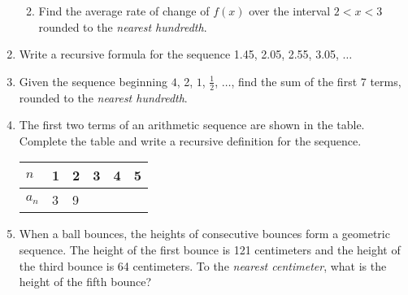 \documentclass[12pt, twoside]{article}
\begin{document}
\begin{enumerate}[itemsep=0.5cm]
\begin{enumerate}
\begin{center}
    \end{center}
    \item Find the average rate of change of $f(x)$ over the interval $2 < x < 3$ rounded to the \emph{nearest hundredth}.
\end{enumerate}

\newpage
\item Write a recursive formula for the sequence 1.45, 2.05, 2.55, 3.05, $\ldots$ \vspace{3cm}


\item Given the sequence beginning  $4$, 2, $1$, $\frac{1}{2}$, $\ldots$, find the sum of the first 7 terms, rounded to the \emph{nearest hundredth}. \vspace{3cm}

\item The first two terms of an arithmetic sequence are shown in the table. Complete the table and write a recursive definition for the sequence.
\begin{center}
\begin{tabular}{|p{1cm}|p{1cm}|p{1cm}|p{1cm}|p{1cm}|p{1cm}|}
    \hline
    $n$ & 1 & 2 & 3 & 4 & 5 \\
    \hline
    $a_n$ & 3 & 9 & & & \\[0.25cm]
    \hline
\end{tabular}
\end{center}

\item When a ball bounces, the heights of consecutive bounces form a geometric sequence. The height of the first bounce is 121 centimeters and the height of the third bounce is 64 centimeters. To the \emph{nearest centimeter}, what is the height of the fifth bounce? %


\end{enumerate}
\end{document}
